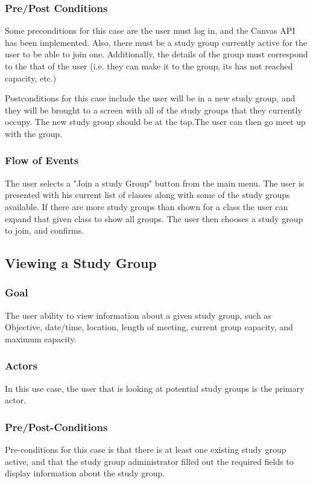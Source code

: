 \documentclass[12pt,letterpaper]{article}
\begin{document}
\subsubsection{Pre/Post Conditions}
Some preconditions for this case are the user must log in, and the Canvas API has been implemented. Also, there must be a study group currently active for the user to be able to join one. Additionally, the details of the group must correspond to the that of the user (i.e. they can make it to the group, its has not reached capacity, etc.)

Postconditions for this case include the user will be in a new study group, and they will be brought to a screen with all of the study groups that they currently occupy. The new study group should be at the top.The user can then go meet up with the group. 

\subsubsection{Flow of Events}
The user selects a "Join a study Group" button from the main menu. The user is presented with his current list of classes along with some of the study groups available. If there are more study groups than shown for a class the user can expand that given class to show all groups. The user then chooses a study group to join, and confirms.

\subsection{Viewing a Study Group}
\subsubsection{Goal}
The user ability to view information about a given study group, such as Objective, date/time, location, length of meeting, current group capacity, and maximum capacity.

\subsubsection{Actors}
In this use case, the user that is looking at potential study groups is the primary actor. 

\subsubsection{Pre/Post-Conditions}
Pre-conditions for this case is that there is at least one existing study group active, and that the study group administrator filled out the required fields to display information about the study group.
\end{document}
